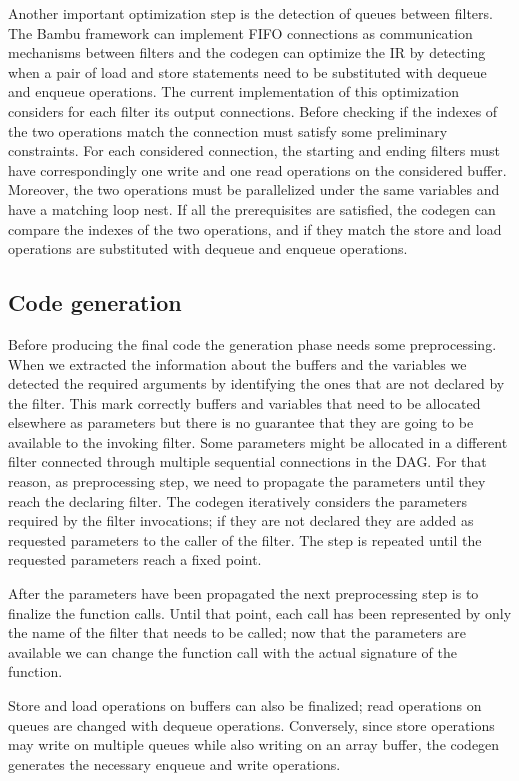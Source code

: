 \documentclass[../main.tex]{subfiles}
\begin{document}
Another important optimization step is the detection of queues between filters. 
The Bambu framework can implement FIFO connections as communication mechanisms between filters and the codegen can optimize the IR by detecting when a pair of load and store statements need to be substituted with dequeue and enqueue operations.
The current implementation of this optimization considers for each filter its output connections.
Before checking if the indexes of the two operations match the connection must satisfy some preliminary constraints.
For each considered connection, the starting and ending filters must have correspondingly one write and one read operations on the considered buffer.
Moreover, the two operations must be parallelized under the same variables and have a matching loop nest.
If all the prerequisites are satisfied, the codegen can compare the indexes of the two operations, and if they match the store and load operations are substituted with dequeue and enqueue operations.


\subsection{Code generation}


Before producing the final code the generation phase needs some preprocessing.
When we extracted the information about the buffers and the variables we detected the required arguments by identifying the ones that are not declared by the filter.
This mark correctly buffers and variables that need to be allocated elsewhere as parameters but there is no guarantee that they are going to be available to the invoking filter.
Some parameters might be allocated in a different filter connected through multiple sequential connections in the DAG.
For that reason, as preprocessing step, we need to propagate the parameters until they reach the declaring filter.
The codegen iteratively considers the parameters required by the filter invocations; if they are not declared they are added as requested parameters to the caller of the filter.
The step is repeated until the requested parameters reach a fixed point.

After the parameters have been propagated the next preprocessing step is to finalize the function calls.
Until that point, each call has been represented by only the name of the filter that needs to be called; now that the parameters are available we can change the function call with the actual signature of the function.

Store and load operations on buffers can also be finalized;  read operations on queues are changed with dequeue operations.
Conversely, since store operations may write on multiple queues while also writing on an array buffer, the codegen generates the necessary enqueue and write operations.
\end{document}
